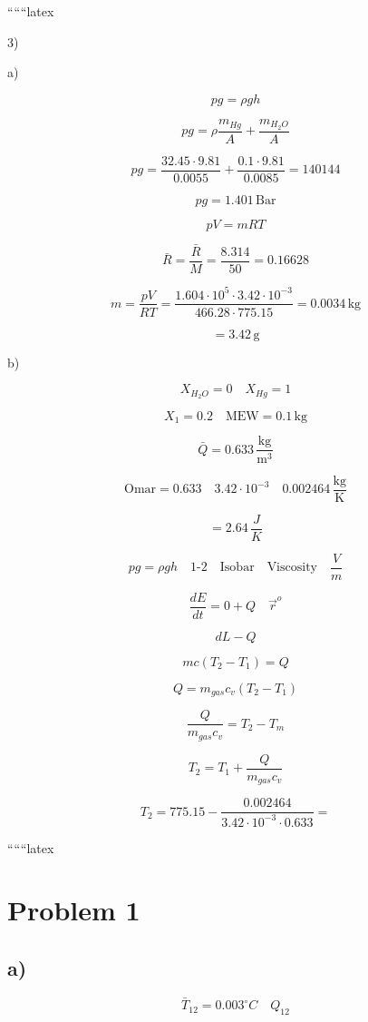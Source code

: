 
``````latex


3)

a)

\[
p g = \rho g h
\]

\[
p g = \rho \frac{m_{Hg}}{A} + \frac{m_{H_2O}}{A}
\]

\[
p g = \frac{32.45 \cdot 9.81}{0.0055} + \frac{0.1 \cdot 9.81}{0.0085} = 140144
\]

\[
p g = 1.401 \, \text{Bar}
\]

\[
p V = m R T
\]

\[
\bar{R} = \frac{\bar{R}}{M} = \frac{8.314}{50} = 0.16628
\]

\[
m = \frac{p V}{R T} = \frac{1.604 \cdot 10^5 \cdot 3.42 \cdot 10^{-3}}{466.28 \cdot 775.15} = 0.0034 \, \text{kg}
\]

\[
= 3.42 \, \text{g}
\]

b)

\[
X_{H_2O} = 0 \quad X_{Hg} = 1
\]

\[
X_1 = 0.2 \quad \text{MEW} = 0.1 \, \text{kg}
\]

\[
\bar{Q} = 0.633 \, \frac{\text{kg}}{\text{m}^3}
\]

\[
\text{Omar} = 0.633 \quad 3.42 \cdot 10^{-3} \quad 0.002464 \, \frac{\text{kg}}{\text{K}}
\]

\[
= 2.64 \, \frac{J}{K}
\]

\[
p g = \rho g h \quad \text{1-2} \quad \text{Isobar} \quad \text{Viscosity} \quad \frac{V}{m}
\]

\[
\frac{dE}{dt} = 0 + Q \quad \vec{r}^o
\]

\[
dL - Q
\]

\[
m c (T_2 - T_1) = Q
\]

\[
Q = m_{gas} c_v (T_2 - T_1)
\]

\[
\frac{Q}{m_{gas} c_v} = T_2 - T_m
\]

\[
T_2 = T_1 + \frac{Q}{m_{gas} c_v}
\]

\[
T_2 = 775.15 - \frac{0.002464}{3.42 \cdot 10^{-3} \cdot 0.633} =
\]

``````latex

\section*{Problem 1}

\subsection*{a)}

\begin{equation*}
\bar{T}_{12} = 0.003^\circ C \quad Q_{12}
\end{equation*}

